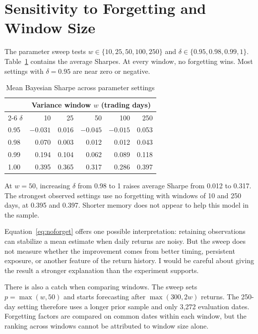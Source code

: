 \documentclass[conference]{IEEEtran}
\begin{document}
\section{Sensitivity to Forgetting and Window Size}
\label{sec:sensitivity}
The parameter sweep tests $w\in\{10,25,50,100,250\}$ and $\delta\in\{0.95,0.98,0.99,1\}$. Table~\ref{tab:sweep} contains the average Sharpes. At every window, no forgetting wins. Most settings with $\delta=0.95$ are near zero or negative.

\begin{table}[t]
\caption{Mean Bayesian Sharpe across parameter settings}
\label{tab:sweep}
\centering\footnotesize
\begin{tabular}{@{}lrrrrr@{}}
\toprule
 & \multicolumn{5}{c}{Variance window $w$ (trading days)}\\
\cmidrule(l){2-6}
$\delta$ & 10 & 25 & 50 & 100 & 250\\
\midrule
0.95 & $-0.031$ & 0.016 & $-0.045$ & $-0.015$ & 0.053\\
0.98 & 0.070 & 0.003 & 0.012 & 0.012 & 0.043\\
0.99 & 0.194 & 0.104 & 0.062 & 0.089 & 0.118\\
1.00 & 0.395 & 0.365 & 0.317 & 0.286 & 0.397\\
\bottomrule
\end{tabular}
\end{table}

At $w=50$, increasing $\delta$ from 0.98 to 1 raises average Sharpe from 0.012 to 0.317. The strongest observed settings use no forgetting with windows of 10 and 250 days, at 0.395 and 0.397. Shorter memory does not appear to help this model in the sample.

Equation~\eqref{eq:noforget} offers one possible interpretation: retaining observations can stabilize a mean estimate when daily returns are noisy. But the sweep does not measure whether the improvement comes from better timing, persistent exposure, or another feature of the return history. I would be careful about giving the result a stronger explanation than the experiment supports.

There is also a catch when comparing windows. The sweep sets $p=\max(w,50)$ and starts forecasting after $\max(300,2w)$ returns. The 250-day setting therefore uses a longer prior sample and only 3,272 evaluation dates. Forgetting factors are compared on common dates within each window, but the ranking across windows cannot be attributed to window size alone.
\end{document}
